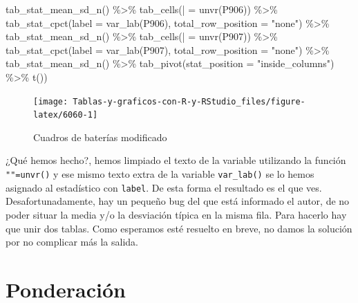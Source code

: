 \documentclass[
]{book}
\newenvironment{Shaded}{\begin{snugshade}}{\end{snugshade}}
\newcommand{\AttributeTok}[1]{\textcolor[rgb]{0.77,0.63,0.00}{#1}}
\newcommand{\FunctionTok}[1]{\textcolor[rgb]{0.00,0.00,0.00}{#1}}
\newcommand{\NormalTok}[1]{#1}
\newcommand{\OtherTok}[1]{\textcolor[rgb]{0.56,0.35,0.01}{#1}}
\newcommand{\SpecialCharTok}[1]{\textcolor[rgb]{0.00,0.00,0.00}{#1}}
\newcommand{\StringTok}[1]{\textcolor[rgb]{0.31,0.60,0.02}{#1}}
\begin{document}
\begin{Shaded}
\begin{Highlighting}[]
  \FunctionTok{tab\_stat\_mean\_sd\_n}\NormalTok{() }\SpecialCharTok{\%\textgreater{}\%}
  \FunctionTok{tab\_cells}\NormalTok{(}\StringTok{\textasciigrave{}}\AttributeTok{|}\StringTok{\textasciigrave{}} \OtherTok{=} \FunctionTok{unvr}\NormalTok{(P906)) }\SpecialCharTok{\%\textgreater{}\%}
  \FunctionTok{tab\_stat\_cpct}\NormalTok{(}\AttributeTok{label =} \FunctionTok{var\_lab}\NormalTok{(P906), }\AttributeTok{total\_row\_position =} \StringTok{"none"}\NormalTok{) }\SpecialCharTok{\%\textgreater{}\%}
  \FunctionTok{tab\_stat\_mean\_sd\_n}\NormalTok{() }\SpecialCharTok{\%\textgreater{}\%}
  \FunctionTok{tab\_cells}\NormalTok{(}\StringTok{\textasciigrave{}}\AttributeTok{|}\StringTok{\textasciigrave{}} \OtherTok{=} \FunctionTok{unvr}\NormalTok{(P907)) }\SpecialCharTok{\%\textgreater{}\%}
  \FunctionTok{tab\_stat\_cpct}\NormalTok{(}\AttributeTok{label =} \FunctionTok{var\_lab}\NormalTok{(P907), }\AttributeTok{total\_row\_position =} \StringTok{"none"}\NormalTok{) }\SpecialCharTok{\%\textgreater{}\%}
  \FunctionTok{tab\_stat\_mean\_sd\_n}\NormalTok{() }\SpecialCharTok{\%\textgreater{}\%}
  \FunctionTok{tab\_pivot}\NormalTok{(}\AttributeTok{stat\_position =} \StringTok{"inside\_columns"}\NormalTok{) }\SpecialCharTok{\%\textgreater{}\%}
  \FunctionTok{t}\NormalTok{())}
\end{Highlighting}
\end{Shaded}

\begin{figure}[H]

{\centering \texttt{[image: Tablas-y-graficos-con-R-y-RStudio\_files/figure-latex/6060-1]} 

}

\caption{Cuadros de baterías modificado}\label{fig:6060}
\end{figure}

¿Qué hemos hecho?, hemos limpiado el texto de la variable utilizando la función \texttt{"\textbar{}"=unvr()} y ese mismo texto extra de la variable \texttt{var\_lab()} se lo hemos asignado al estadístico con \texttt{label}. De esta forma el resultado es el que ves. Desafortunadamente, hay un pequeño bug del que está informado el autor, de no poder situar la media y/o la desviación típica en la misma fila. Para hacerlo hay que unir dos tablas. Como esperamos esté resuelto en breve, no damos la solución por no complicar más la salida.

\hypertarget{ponderaciuxf3n}{%
\section{Ponderación}\label{ponderaciuxf3n}}
\end{document}
